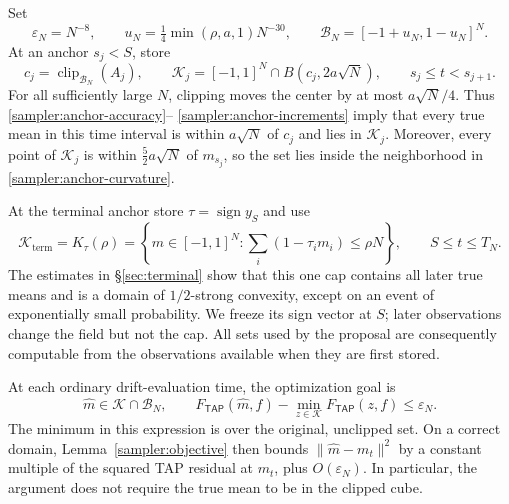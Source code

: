 \documentclass[11pt,reqno]{amsart}
\def\tap{{\mathsf{TAP}}}
\newcommand{\sign}{\operatorname{sign}}
\begin{document}
Set
\[
 \varepsilon_N=N^{-8},\qquad
 u_N=\tfrac14\min(\rho,a,1)N^{-30},\qquad
 \mathcal B_N=[-1+u_N,1-u_N]^N.
\]
At an anchor $s_j<S$, store
\begin{equation}\label{sampler:ball-domain}
 c_j=\operatorname{clip}_{\mathcal B_N}(A_j),\qquad
 \mathcal K_j=[-1,1]^N\cap B(c_j,2a\sqrt N),
 \qquad s_j\le t<s_{j+1}.
\end{equation}
For all sufficiently large $N$, clipping moves the center by at most
$a\sqrt N/4$. Thus \eqref{sampler:anchor-accuracy}--
\eqref{sampler:anchor-increments} imply that every true mean in this
time interval is within $a\sqrt N$ of $c_j$ and lies in
$\mathcal K_j$. Moreover, every point of $\mathcal K_j$ is within
$\frac52a\sqrt N$ of $m_{s_j}$, so the set lies inside the
neighborhood in \eqref{sampler:anchor-curvature}.

At the terminal anchor store $\tau=\sign y_S$ and use
\begin{equation*}
 \mathcal K_{\mathrm{term}}=K_\tau(\rho)
   =\left\{m\in[-1,1]^N:
             \sum_i(1-\tau_i m_i)\le\rho N\right\},
 \qquad S\le t\le T_N.
\end{equation*}
The estimates in \S\ref{sec:terminal} show that this one cap contains
all later true means and is a domain of $1/2$-strong convexity, except
on an event of exponentially small probability. We freeze its sign
vector at $S$; later observations change the field but not the cap.
All sets used by the proposal are consequently computable from the
observations available when they are first stored.

At each ordinary drift-evaluation time, the optimization goal is
\begin{equation}\label{eq:algorithm-objective}
 \widehat m\in\mathcal K\cap\mathcal B_N,\qquad
  F_{\tap}(\widehat m,f)-\min_{z\in\mathcal K} F_{\tap}(z,f)
       \le\varepsilon_N.
\end{equation}
The minimum in this expression is over the original, unclipped set.
On a correct domain, Lemma~\ref{sampler:objective} then bounds
$\|\widehat m-m_t\|^2$ by a constant multiple of the squared TAP
residual at $m_t$, plus $O(\varepsilon_N)$.
In particular, the argument does not require the true mean to be in
the clipped cube.
\end{document}
